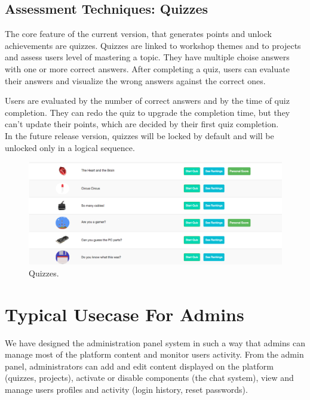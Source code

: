 \subsection{Assessment Techniques: Quizzes}

The core feature of the current version, that generates points and unlock achievements are quizzes. Quizzes are linked to workshop themes and to projects and assess users level of mastering a topic. They have multiple choise answers with one or more correct answers.
After completing a quiz, users can evaluate their answers and visualize the wrong answers against the correct ones. 

Users are evaluated by the number of correct answers and by the time of quiz completion. They can redo the quiz to upgrade the completion time, but they can't update their points, which are decided by their first quiz completion. \\

In the future release version, quizzes will be locked by default and will be unlocked only in a logical sequence. 

\begin{figure}
\includegraphics[width=1\linewidth]{images/ui/Quizzes.png}
\caption{Quizzes.}
\label{fig:Quizzes}
\end{figure}


\section{Typical Usecase For Admins}

We have designed the administration panel system in such a way that admins can manage most of the platform content and monitor users activity. From the admin panel, administrators can add and edit content displayed on the platform (quizzes, projects), activate or disable components (the chat system), view and manage users profiles and activity (login history, reset passwords).\\

